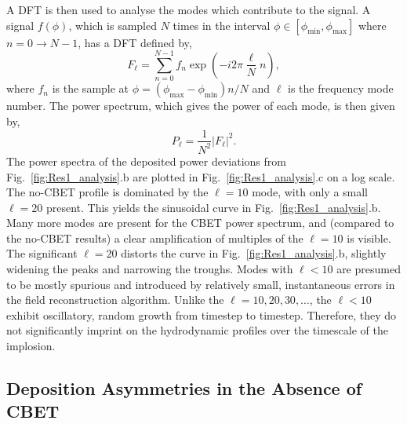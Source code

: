 A \ac{DFT} is then used to analyse the modes which contribute to the signal.
A signal $f(\phi)$, which is sampled $N$ times in the interval $\phi\in[\phi_{\text{min}},\phi_{\text{max}}]$ where $n=0\rightarrow N-1$, has a \ac{DFT} defined by,
\begin{equation}
    F_{\ell} = \sum_{n=0}^{N-1} f_n \exp{\left( -i2\pi \frac{\ell}{N}n \right)},
\end{equation}
where $f_n$ is the sample at $\phi=(\phi_{\text{max}}-\phi_{\text{min}})n/N$ and $\ell$ is the frequency mode number.
The power spectrum, which gives the power of each mode, is then given by,
\begin{equation}
    P_{\ell} = \frac{1}{N^2}|F_{\ell}|^2.
\end{equation}
The power spectra of the deposited power deviations from Fig.~\ref{fig:Res1_analysis}.b are plotted in Fig.~\ref{fig:Res1_analysis}.c on a log scale.
The no-\ac{CBET} profile is dominated by the $\ell=10$ mode, with only a small $\ell=20$ present.
This yields the sinusoidal curve in Fig.~\ref{fig:Res1_analysis}.b.
Many more modes are present for the \ac{CBET} power spectrum, and (compared to the no-\ac{CBET} results) a clear amplification of multiples of the $\ell=10$ is visible.
The significant $\ell=20$ distorts the curve in Fig.~\ref{fig:Res1_analysis}.b, slightly widening the peaks and narrowing the troughs.
Modes with $\ell<10$ are presumed to be mostly spurious and introduced by relatively small, instantaneous errors in the field reconstruction algorithm.
Unlike the $\ell=10,20,30,\ldots$, the $\ell<10$ exhibit oscillatory, random growth from timestep to timestep.
Therefore, they do not significantly imprint on the hydrodynamic profiles over the timescale of the implosion.


\subsection{Deposition Asymmetries in the Absence of CBET}%
\label{sec:Res1_noCBET_asymmetries}

